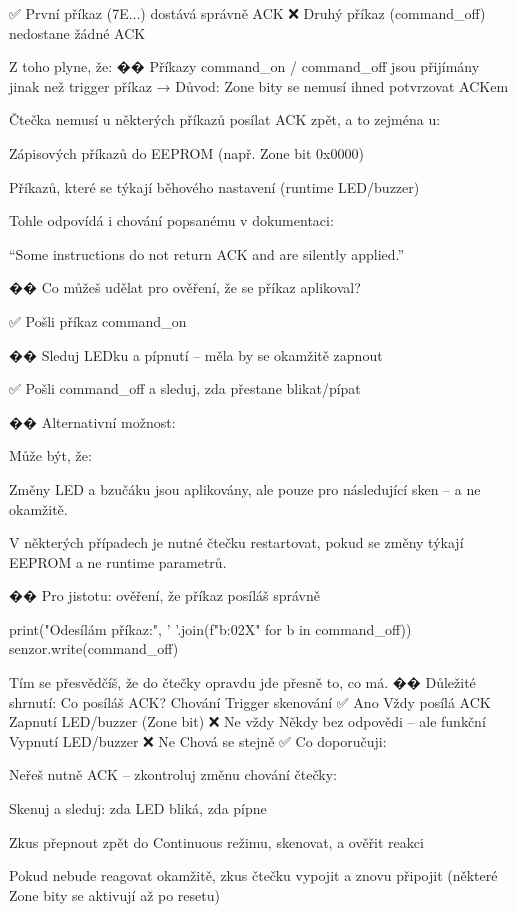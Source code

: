 ✅ První příkaz (\x7E...) dostává správně ACK
❌ Druhý příkaz (command_off) nedostane žádné ACK

Z toho plyne, že:
�� Příkazy command_on / command_off jsou přijímány jinak než trigger příkaz
→ Důvod: Zone bity se nemusí ihned potvrzovat ACKem

Čtečka nemusí u některých příkazů posílat ACK zpět, a to zejména u:

    Zápisových příkazů do EEPROM (např. Zone bit 0x0000)

    Příkazů, které se týkají běhového nastavení (runtime LED/buzzer)

Tohle odpovídá i chování popsanému v dokumentaci:

    “Some instructions do not return ACK and are silently applied.”

�� Co můžeš udělat pro ověření, že se příkaz aplikoval?

    ✅ Pošli příkaz command_on

    �� Sleduj LEDku a pípnutí – měla by se okamžitě zapnout

    ✅ Pošli command_off a sleduj, zda přestane blikat/pípat

�� Alternativní možnost:

Může být, že:

    Změny LED a bzučáku jsou aplikovány, ale pouze pro následující sken – a ne okamžitě.

    V některých případech je nutné čtečku restartovat, pokud se změny týkají EEPROM a ne runtime parametrů.

�� Pro jistotu: ověření, že příkaz posíláš správně

print("Odesílám příkaz:", ' '.join(f"{b:02X}" for b in command_off))
senzor.write(command_off)

Tím se přesvědčíš, že do čtečky opravdu jde přesně to, co má.
�� Důležité shrnutí:
Co posíláš	ACK?	Chování
Trigger skenování	✅ Ano	Vždy posílá ACK
Zapnutí LED/buzzer (Zone bit)	❌ Ne vždy	Někdy bez odpovědi – ale funkční
Vypnutí LED/buzzer	❌ Ne	Chová se stejně
✅ Co doporučuji:

    Neřeš nutně ACK – zkontroluj změnu chování čtečky:

        Skenuj a sleduj: zda LED bliká, zda pípne

    Zkus přepnout zpět do Continuous režimu, skenovat, a ověřit reakci

    Pokud nebude reagovat okamžitě, zkus čtečku vypojit a znovu připojit (některé Zone bity se aktivují až po resetu)

